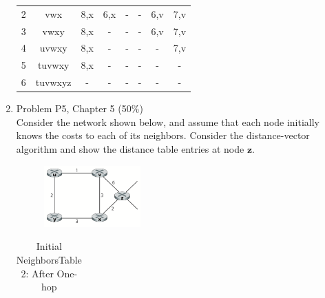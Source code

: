 \documentclass[12pt]{article}
\begin{document}
\begin{enumerate}
\begin{table}[ht]
\begin{tabular}{@{}lccccccc@{}}
2    & vwx     & 8,x                        & {\color[HTML]{FE0000} 6,x} & -                          & -                          & 6,v                        & 7,v                        \\
3    & vwxy    & 8,x                        & -                          & -                          & -                          & {\color[HTML]{FE0000} 6,v} & 7,v                        \\
4    & uvwxy   & 8,x                        & -                          & -                          & -                          & -                          & {\color[HTML]{FE0000} 7,v} \\
5    & tuvwxy  & {\color[HTML]{FE0000} 8,x} & -                          & -                          & -                          & -                          & -                          \\
6    & tuvwxyz & -                          & -                          & -                          & -                          & -                          & -                          \\ \bottomrule
\end{tabular}
\end{table}
\newpage
\bfseries \item Problem P5, Chapter 5 (50\%)\\[1em]
Consider the network shown below, and assume that each node initially knows the costs to each of its neighbors. Consider the distance-vector algorithm and show the distance table entries at node $\bm{z}$.\par
\begin{figure}[h!]
    \centering
    \includegraphics[width=0.35\textwidth]{Screen Shot 2020-05-05 at 00.33.53.png}
\end{figure}
\begin{table}[ht]
\centering
\caption{Initial Neighbors\hspace{4.5em}Table 2: After One-hop}\vspace{1em}
\begin{tabular}{cc|ccccc ccc c|cccccc ccc c|cccccc}

\end{tabular}
\end{table}
\end{enumerate}
\end{document}
